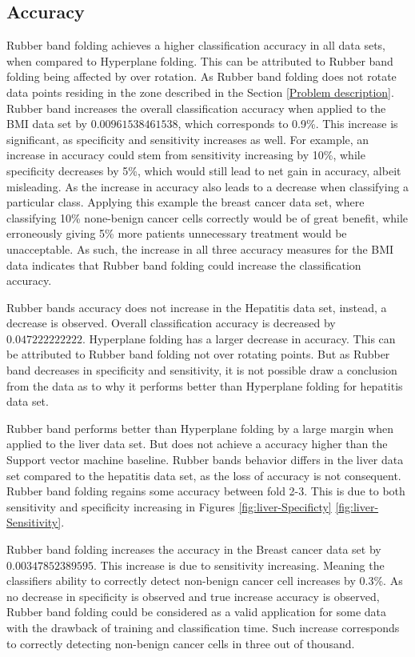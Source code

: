 \documentclass[a4paper,twoside]{bth}
\begin{document}
\subsection{Accuracy}
\par Rubber band folding achieves a higher classification accuracy in all data sets, when compared to Hyperplane folding. This can be attributed to Rubber band folding being affected by over rotation. As Rubber band folding does not rotate data points residing in the zone described in the Section \ref{Problem description}. Rubber band increases the overall classification accuracy when applied to the BMI data set by $0.00961538461538$, which corresponds to 0.9\%. This increase is significant, as specificity and sensitivity increases as well. For example,  an increase in accuracy could stem from sensitivity increasing by 10\%, while specificity decreases by 5\%, which would still lead to net gain in accuracy, albeit misleading. As the increase in accuracy also leads to a decrease when classifying a particular class. Applying this example the breast cancer data set, where classifying 10\% none-benign cancer cells correctly would be of great benefit, while erroneously giving 5\% more patients unnecessary treatment would be unacceptable. As such, the increase in all three accuracy measures for the BMI data indicates that Rubber band folding could increase the classification accuracy. 
\par Rubber bands accuracy does not increase in the Hepatitis data set, instead, a decrease is observed. Overall classification accuracy is decreased by $0.047222222222$. Hyperplane folding has a larger decrease in accuracy. This can be attributed to Rubber band folding not over rotating points. But as Rubber band decreases in specificity and sensitivity, it is not possible draw a conclusion from the data as to why it performs better than Hyperplane folding for hepatitis data set. 
\par Rubber band performs better than Hyperplane folding by a large margin when applied to the liver data set. But does not achieve a accuracy higher than the Support vector machine baseline. Rubber bands behavior differs in the liver data set compared to the hepatitis data set, as the loss of accuracy is not consequent. Rubber band folding regains some accuracy between fold 2-3. This is due to both sensitivity and specificity increasing in Figures \ref{fig:liver-Specificty} \ref{fig:liver-Sensitivity}.
\par Rubber band folding increases the accuracy in the Breast cancer data set by $0.00347852389595$. This increase is due to sensitivity increasing. Meaning the classifiers ability to correctly detect non-benign cancer cell increases by 0.3\%. As no decrease in specificity is observed and true increase accuracy is observed, Rubber band folding could be considered as a valid application for some data with the drawback of training and classification time. Such increase corresponds to correctly detecting non-benign cancer cells in three out of thousand.
\end{document}
